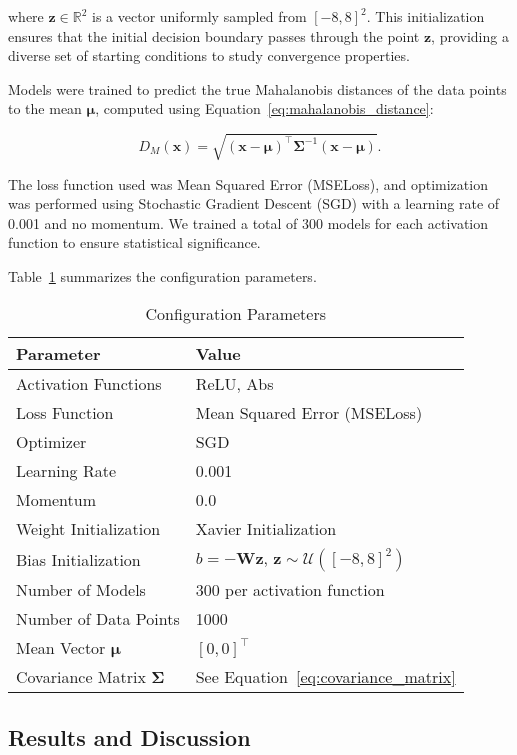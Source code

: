 where $\mathbf{z} \in \mathbb{R}^2$ is a vector uniformly sampled from $[-8, 8]^2$. This initialization ensures that the initial decision boundary passes through the point $\mathbf{z}$, providing a diverse set of starting conditions to study convergence properties.

Models were trained to predict the true Mahalanobis distances of the data points to the mean $\boldsymbol{\mu}$, computed using Equation~\eqref{eq:mahalanobis_distance}:

\begin{equation}
D_M(\mathbf{x}) = \sqrt{ (\mathbf{x} - \boldsymbol{\mu})^\top \boldsymbol{\Sigma}^{-1} (\mathbf{x} - \boldsymbol{\mu}) }.
\end{equation}

The loss function used was Mean Squared Error (MSELoss), and optimization was performed using Stochastic Gradient Descent (SGD) with a learning rate of 0.001 and no momentum. We trained a total of 300 models for each activation function to ensure statistical significance.

Table~\ref{tab:config_params} summarizes the configuration parameters.

\begin{table}[h]
\centering
\caption{Configuration Parameters}
\label{tab:config_params}
\begin{tabular}{ll}
\hline
Parameter & Value \\
\hline
Activation Functions & ReLU, Abs \\
Loss Function & Mean Squared Error (MSELoss) \\
Optimizer & SGD \\
Learning Rate & 0.001 \\
Momentum & 0.0 \\
Weight Initialization & Xavier Initialization \\
Bias Initialization & $b = -\mathbf{W} \mathbf{z}$, $\mathbf{z} \sim \mathcal{U}([-8,8]^2)$ \\
Number of Models & 300 per activation function \\
Number of Data Points & 1000 \\
Mean Vector $\boldsymbol{\mu}$ & $[0, 0]^\top$ \\
Covariance Matrix $\boldsymbol{\Sigma}$ & See Equation~\eqref{eq:covariance_matrix} \\
\hline
\end{tabular}
\end{table}

\subsection{Results and Discussion}

